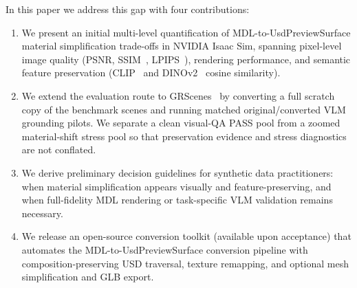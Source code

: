 In this paper we address this gap with four contributions:
\begin{enumerate}
    \item We present an initial multi-level quantification of
    MDL-to-UsdPreviewSurface material simplification trade-offs in NVIDIA Isaac
    Sim, spanning pixel-level image quality
    (PSNR, SSIM~\cite{Wang2004Image}, LPIPS~\cite{Zhang2018Unreasonable}),
    rendering performance, and semantic feature preservation
    (CLIP~\cite{Radford2021Learning} and
    DINOv2~\cite{Oquab2023DINOv2} cosine similarity).
    \item We extend the evaluation route to GRScenes~\cite{Wang2024GRUtopia}
    by converting a full scratch copy of the benchmark scenes and running matched original/converted
    VLM grounding pilots. We separate a clean visual-QA PASS pool from a
    zoomed material-shift stress pool so that preservation evidence and stress
    diagnostics are not conflated.
    \item We derive preliminary decision guidelines for synthetic data
    practitioners: when material simplification appears visually and
    feature-preserving, and when full-fidelity MDL rendering or task-specific
    VLM validation remains necessary.
    \item We release an open-source conversion toolkit (available upon acceptance) that
    automates the MDL-to-UsdPreviewSurface conversion pipeline with
    composition-preserving USD traversal, texture remapping, and optional mesh
    simplification and GLB export.
\end{enumerate}
